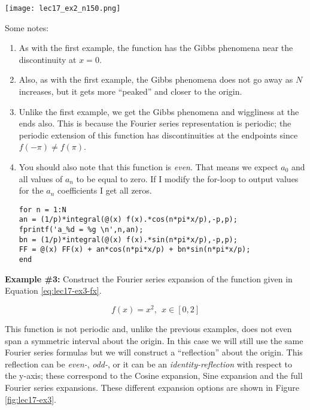 \begin{marginfigure}
\texttt{[image: lec17\_ex2\_n150.png]}
\caption{Fourier series expansion with \lstinline{N=150}.}
\label{fig:lec17-ex2-n150}
\end{marginfigure}
Some notes:
\begin{enumerate}
\item As with the first example, the function has the Gibbs phenomena near the discontinuity at $x=0$.  
\item Also, as with the first example, the Gibbs phenomena does not go away as $N$ increases, but it gets more ``peaked'' and closer to the origin.
\item Unlike the first example, we get the Gibbs phenomena and wiggliness at the ends also.  This is because the Fourier series representation is periodic; the periodic extension of this function has discontinuities at the endpoints since $f(-\pi) \ne f(\pi)$.  
\item You should also note that this function is \emph{even}.  That means we expect $a_0$ and all values of $a_n$ to be equal to zero. If I modify the for-loop to output values for the $a_n$ coefficients I get all zeros.

\begin{lstlisting}[style=myMatlab]
for n = 1:N
an = (1/p)*integral(@(x) f(x).*cos(n*pi*x/p),-p,p);
fprintf('a_%d = %g \n',n,an);
bn = (1/p)*integral(@(x) f(x).*sin(n*pi*x/p),-p,p);
FF = @(x) FF(x) + an*cos(n*pi*x/p) + bn*sin(n*pi*x/p); 
end
\end{lstlisting}
\end{enumerate}


\vspace{1.0cm}

\noindent\textbf{Example \#3:} Construct the Fourier series expansion of the function given in Equation \ref{eq:lec17-ex3-fx}.

\begin{equation}
f(x) = x^2, \ \ x \in[0,2]
\label{eq:lec17-ex3-fx}
\end{equation}

This function is not periodic and, unlike the previous examples, does not even span a symmetric interval about the origin.  In this case we will still use the same Fourier series formulas but we will construct a ``reflection'' about the origin.  This reflection can be \emph{even-}, \emph{odd-}, or it can be an \emph{identity-reflection} with respect to the y-axis; these correspond to the Cosine expansion, Sine expansion and the full Fourier series expansions.  These different expansion options are shown in Figure \ref{fig:lec17-ex3}.

